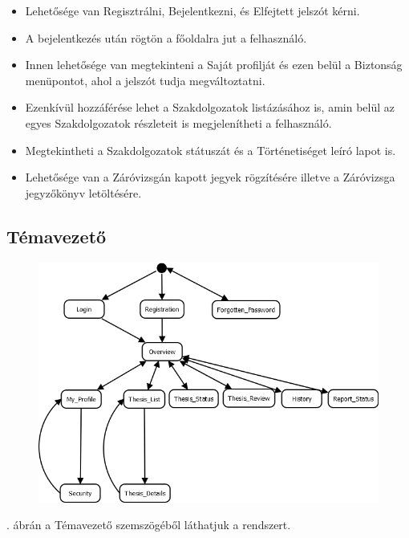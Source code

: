 \documentclass[a4paper,12pt]{article}
\begin{document}
\begin{itemize}
	\item Lehetősége van Regisztrálni, Bejelentkezni, és Elfejtett jelszót kérni. 
	\item A bejelentkezés után rögtön a főoldalra jut a felhasználó. 
	\item Innen lehetősége van megtekinteni a Saját profilját és ezen belül a Biztonság menüpontot, ahol a jelszót tudja megváltoztatni. 
	\item Ezenkívül hozzáférése lehet a Szakdolgozatok listázásához is, amin belül az egyes Szakdolgozatok részleteit is megjelenítheti a felhasználó. 
	\item Megtekintheti a Szakdolgozatok státuszát és a Történetiséget leíró lapot is. 
	\item Lehetősége van a Záróvizsgán kapott jegyek rögzítésére illetve a Záróvizsga jegyzőkönyv letöltésére. 
\end{itemize}

\subsection{Témavezető}

\begin{figure}
	\centering
	\includegraphics[width=\textwidth]{images/Lapok_kozotti_atmenetek/Temavezeto.png}
	\caption{}
	\label{fig:Temavezeto}
\end{figure}

. ábrán a Témavezető szemszögéből láthatjuk a rendszert.
\end{document}
